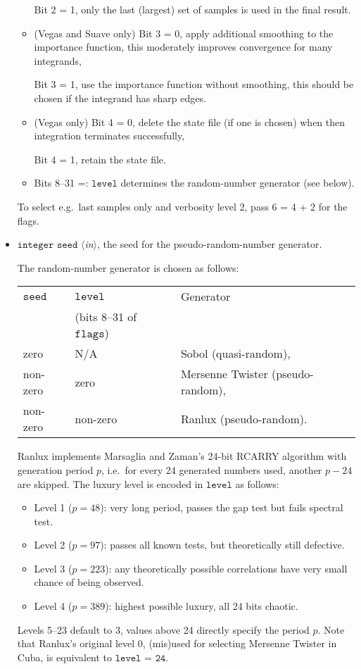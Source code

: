 \documentclass[12pt]{article}
\newcommand\ie{i.e.\ }
\newcommand\eg{e.g.\ }
\newcommand\Code[1]{\ensuremath{\texttt{#1}}}
\newcommand\VarIn[1]{\item\Code{#1} \textit{$\langle$in\/$\rangle$},}
\begin{document}
\begin{itemize}
\begin{itemize}
Bit 2 = 1,
only the last (largest) set of samples is used in the final result.

\item (Vegas and Suave only) Bit 3 = 0,
apply additional smoothing to the importance function, this moderately
improves convergence for many integrands,

Bit 3 = 1,
use the importance function without smoothing, this should be chosen if 
the integrand has sharp edges.

\item (Vegas only) Bit 4 = 0,
delete the state file (if one is chosen) when then integration
terminates successfully,

Bit 4 = 1,
retain the state file.

\item Bits 8--31 =: \Code{level} determines the random-number generator
(see below).
\end{itemize}

To select \eg last samples only and verbosity level 2, pass 6 = 4 + 2
for the flags.

\VarIn{integer seed}
the seed for the pseudo-random-number generator.

The random-number generator is chosen as follows:
\begin{center}
\begin{tabular}{l|l|l}
\Code{seed} & \Code{level} & Generator \\
& {\small (bits 8--31 of \Code{flags})} & \\ \hline
zero & N/A & Sobol (quasi-random), \\
non-zero & zero & Mersenne Twister (pseudo-random), \\
non-zero & non-zero & Ranlux (pseudo-random).
\end{tabular}
\end{center}

Ranlux implements Marsaglia and Zaman's 24-bit RCARRY algorithm with
generation period $p$, \ie for every 24 generated numbers used, another
$p - 24$ are skipped.  The luxury level is encoded in \Code{level} as
follows:
\begin{itemize}
\item Level 1 ($p = 48$):
	very long period, passes the gap test but fails spectral test.
\item Level 2 ($p = 97$):
	passes all known tests, but theoretically still defective.
\item Level 3 ($p = 223$):
	any theoretically possible correlations have very small 
	chance of being observed.
\item Level 4 ($p = 389$):
	highest possible luxury, all 24 bits chaotic.
\end{itemize}
Levels 5--23 default to 3, values above 24 directly specify the period
$p$.  Note that Ranlux's original level 0, (mis)used for selecting
Mersenne Twister in Cuba, is equivalent to \Code{level = 24}.


\end{itemize}
\end{document}
